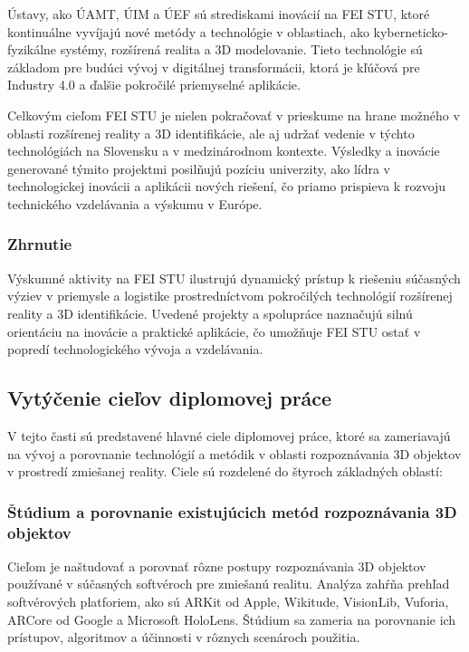 Ústavy, ako ÚAMT, ÚIM a ÚEF sú strediskami inovácií na FEI STU, ktoré kontinuálne vyvíjajú nové metódy a technológie v oblastiach, ako kyberneticko-fyzikálne systémy, rozšírená realita a 3D modelovanie. Tieto technológie sú základom pre budúci vývoj v digitálnej transformácii, ktorá je kľúčová pre Industry 4.0 a ďalšie pokročilé priemyselné aplikácie.

Celkovým cieľom FEI STU je nielen pokračovať v prieskume na hrane možného v oblasti rozšírenej reality a 3D identifikácie, ale aj udržať vedenie v týchto technológiách na Slovensku a v medzinárodnom kontexte. Výsledky a inovácie generované týmito projektmi posilňujú pozíciu univerzity, ako lídra v technologickej inovácii a aplikácii nových riešení, čo priamo prispieva k rozvoju technického vzdelávania a výskumu v Európe.

\subsubsection{Zhrnutie}

Výskumné aktivity na FEI STU ilustrujú dynamický prístup k riešeniu súčasných výziev v priemysle a logistike prostredníctvom pokročilých technológií rozšírenej reality a 3D identifikácie. Uvedené projekty a spolupráce naznačujú silnú orientáciu na inovácie a praktické aplikácie, čo umožňuje FEI STU ostať v popredí technologického vývoja a vzdelávania.

\subsection{Vytýčenie cieľov diplomovej práce}
V tejto časti sú predstavené hlavné ciele diplomovej práce, ktoré sa zameriavajú na vývoj a porovnanie technológií a metódik v oblasti rozpoznávania 3D objektov v prostredí zmiešanej reality. Ciele sú rozdelené do štyroch základných oblastí:

\subsubsection{Štúdium a porovnanie existujúcich metód rozpoznávania 3D objektov}
Cieľom je naštudovať a porovnať rôzne postupy rozpoznávania 3D objektov používané v súčasných softvéroch pre zmiešanú realitu. Analýza zahŕňa prehľad softvérových platforiem, ako sú ARKit od Apple, Wikitude, VisionLib, Vuforia, ARCore od Google a Microsoft HoloLens. Štúdium sa zameria na porovnanie ich prístupov, algoritmov a účinnosti v rôznych scenároch použitia.

